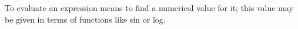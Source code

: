         To evaluate an expression means to find a
numerical value for it; this value may be given
in terms of functions like sin or log.

	